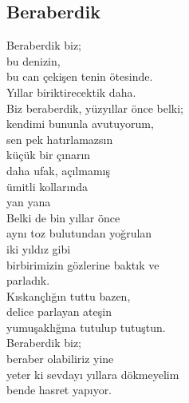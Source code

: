 \subsection{Beraberdik}

Beraberdik biz; \\
	bu denizin, \\
		bu can çekişen tenin ötesinde. \\
Yıllar biriktirecektik daha. \\

\noindent\newline
Biz beraberdik, yüzyıllar önce belki; \\
kendimi bununla avutuyorum, \\
sen pek hatırlamazsın \\
küçük bir çınarın \\
	daha ufak, açılmamış \\
		ümitli kollarında \\
			yan yana \\

			\noindent\newline
Belki de bin yıllar önce \\
	aynı toz bulutundan yoğrulan \\
		iki yıldız gibi \\
			birbirimizin gözlerine baktık ve \\
				parladık. \\

				\noindent\newline
Kıskançlığın tuttu bazen, \\
delice parlayan ateşin \\
yumuşaklığına tutulup tutuştun. \\

\noindent\newline
Beraberdik biz; \\
beraber olabiliriz yine \\
	yeter ki sevdayı yıllara dökmeyelim \\
bende hasret yapıyor. \\
